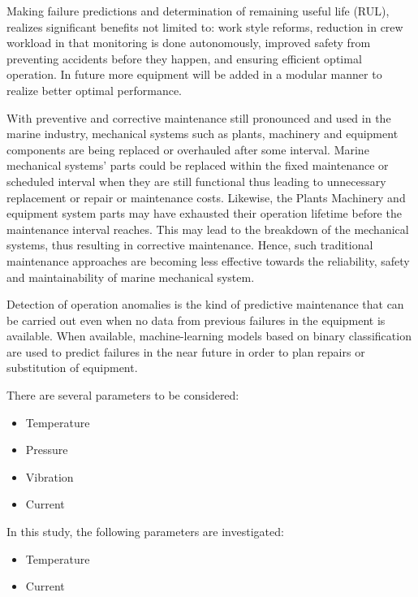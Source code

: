  Making failure predictions and determination of remaining useful life (RUL), realizes significant benefits not limited to: work style reforms, reduction in crew workload in that monitoring is done autonomously, improved safety from preventing accidents before they happen, and ensuring efficient optimal operation. In future more equipment will be added in a modular manner to realize better optimal performance.  

With preventive and corrective maintenance still pronounced and used in the marine industry, mechanical systems such as plants, machinery and equipment components are being replaced or overhauled after some interval. Marine mechanical systems’ parts could be replaced within the fixed maintenance or scheduled interval when they are still functional thus leading to unnecessary replacement or repair or maintenance costs. Likewise, the Plants Machinery and equipment system parts may have exhausted their operation lifetime before the maintenance interval reaches. This may lead to the breakdown of the mechanical systems, thus resulting in corrective maintenance. Hence, such traditional maintenance approaches are becoming less effective towards the reliability, safety and maintainability of marine mechanical system.

Detection of operation anomalies is the kind of predictive maintenance that can be carried out even when no data from previous failures in the equipment is available. When available, machine-learning models based on binary classification are used to predict failures in the near future in order to plan repairs or substitution of equipment\cite{han_motor_2019}.

There are several parameters to be considered:
\begin{itemize}
	\item Temperature 
	\item Pressure
	\item Vibration
	\item Current
\end{itemize}
In this study, the following parameters are investigated:
\begin{itemize}
	\item Temperature
	\item Current
\end{itemize}
	
	

